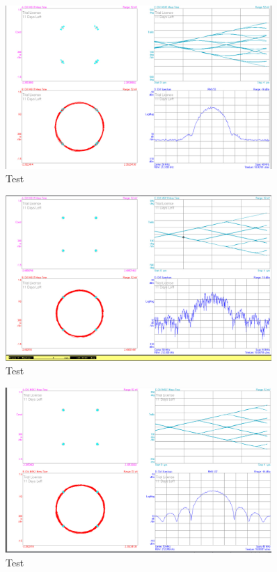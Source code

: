 \documentclass[12pt,a4paper,ngerman]{article}
\begin{document}
\pagebreak
\begin{figure}[H]
\centering
\includegraphics[width=0.9\textwidth]{figures/Aufgabe3_GMSK_avg.jpg} 
\caption{Test}
\end{figure}

\begin{figure}[H]
\centering
\includegraphics[width=0.9\textwidth]{figures/Aufgabe3_MSK.jpg} 
\caption{Test}
\end{figure}


\pagebreak
\begin{figure}[H]
\centering
\includegraphics[width=0.9\textwidth]{figures/Aufgabe3_MSK_avg.jpg} 
\caption{Test}
\end{figure}
\end{document}

